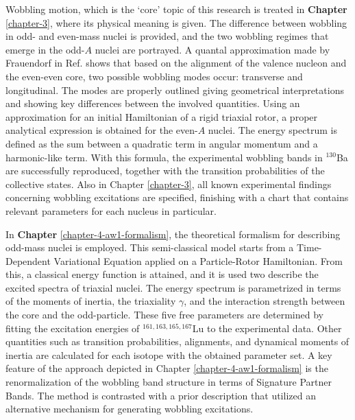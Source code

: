 Wobbling motion, which is the `core' topic of this research is treated in \textbf{Chapter} \ref{chapter-3}, where its physical meaning is given. The difference between wobbling in odd- and even-mass nuclei is provided, and the two wobbling regimes that emerge in the odd-$A$ nuclei are portrayed. A quantal approximation made by Frauendorf in Ref. \cite{frauendorf2014transverse} shows that based on the alignment of the valence nucleon and the even-even core, two possible wobbling modes occur: transverse and longitudinal. The modes are properly outlined giving geometrical interpretations and showing key differences between the involved quantities. Using an approximation for an initial Hamiltonian of a rigid triaxial rotor, a proper analytical expression is obtained for the even-$A$ nuclei. The energy spectrum is defined as the sum between a quadratic term in angular momentum and a harmonic-like term. With this formula, the experimental wobbling bands in $^{130}$Ba are successfully reproduced, together with the transition probabilities of the collective states. Also in Chapter \ref{chapter-3}, all known experimental findings concerning wobbling excitations are specified, finishing with a chart that contains relevant parameters for each nucleus in particular. 

In \textbf{Chapter} \ref{chapter-4-aw1-formalism}, the theoretical formalism for describing odd-mass nuclei is employed. This semi-classical model starts from a Time-Dependent Variational Equation applied on a Particle-Rotor Hamiltonian. From this, a classical energy function is attained, and it is used two describe the excited spectra of triaxial nuclei. The energy spectrum is parametrized in terms of the moments of inertia, the triaxiality $\gamma$, and the interaction strength between the core and the odd-particle. These five free parameters are determined by fitting the excitation energies of $^{161,163,165,167}$Lu to the experimental data. Other quantities such as transition probabilities, alignments, and dynamical moments of inertia are calculated for each isotope with the obtained parameter set. A key feature of the approach depicted in Chapter \ref{chapter-4-aw1-formalism} is the renormalization of the wobbling band structure in terms of Signature Partner Bands. The method is contrasted with a prior description that utilized an alternative mechanism for generating wobbling excitations.

